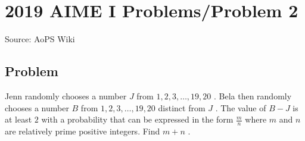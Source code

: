 \documentclass[12pt]{article}
\begin{document}
\section*{{2019 AIME I Problems/Problem 2}}
Source: AoPS Wiki

\subsection*{Problem}
Jenn randomly chooses a number $J$ from $1, 2, 3,\ldots, 19, 20$ . Bela then randomly chooses a number $B$ from $1, 2, 3,\ldots, 19, 20$ distinct from $J$ . The value of $B - J$ is at least $2$ with a probability that can be expressed in the form $\frac{m}{n}$ where $m$ and $n$ are relatively prime positive integers. Find $m+n$ .
\end{document}
